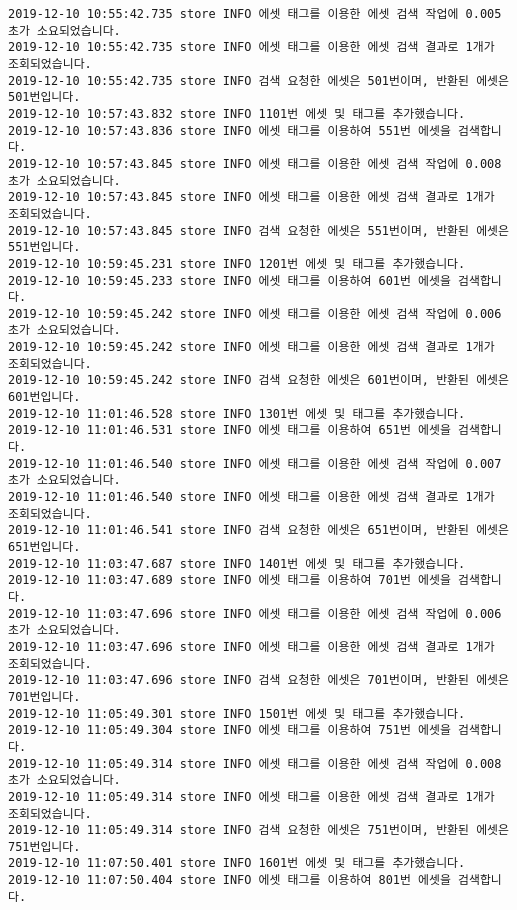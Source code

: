 \begin{Verbatim}[fontsize=\tiny, breaklines=true, breakanywhere=true]
2019-12-10 10:55:42.735 store INFO 에셋 태그를 이용한 에셋 검색 작업에 0.005초가 소요되었습니다.
2019-12-10 10:55:42.735 store INFO 에셋 태그를 이용한 에셋 검색 결과로 1개가 조회되었습니다.
2019-12-10 10:55:42.735 store INFO 검색 요청한 에셋은 501번이며, 반환된 에셋은 501번입니다.
2019-12-10 10:57:43.832 store INFO 1101번 에셋 및 태그를 추가했습니다.
2019-12-10 10:57:43.836 store INFO 에셋 태그를 이용하여 551번 에셋을 검색합니다.
2019-12-10 10:57:43.845 store INFO 에셋 태그를 이용한 에셋 검색 작업에 0.008초가 소요되었습니다.
2019-12-10 10:57:43.845 store INFO 에셋 태그를 이용한 에셋 검색 결과로 1개가 조회되었습니다.
2019-12-10 10:57:43.845 store INFO 검색 요청한 에셋은 551번이며, 반환된 에셋은 551번입니다.
2019-12-10 10:59:45.231 store INFO 1201번 에셋 및 태그를 추가했습니다.
2019-12-10 10:59:45.233 store INFO 에셋 태그를 이용하여 601번 에셋을 검색합니다.
2019-12-10 10:59:45.242 store INFO 에셋 태그를 이용한 에셋 검색 작업에 0.006초가 소요되었습니다.
2019-12-10 10:59:45.242 store INFO 에셋 태그를 이용한 에셋 검색 결과로 1개가 조회되었습니다.
2019-12-10 10:59:45.242 store INFO 검색 요청한 에셋은 601번이며, 반환된 에셋은 601번입니다.
2019-12-10 11:01:46.528 store INFO 1301번 에셋 및 태그를 추가했습니다.
2019-12-10 11:01:46.531 store INFO 에셋 태그를 이용하여 651번 에셋을 검색합니다.
2019-12-10 11:01:46.540 store INFO 에셋 태그를 이용한 에셋 검색 작업에 0.007초가 소요되었습니다.
2019-12-10 11:01:46.540 store INFO 에셋 태그를 이용한 에셋 검색 결과로 1개가 조회되었습니다.
2019-12-10 11:01:46.541 store INFO 검색 요청한 에셋은 651번이며, 반환된 에셋은 651번입니다.
2019-12-10 11:03:47.687 store INFO 1401번 에셋 및 태그를 추가했습니다.
2019-12-10 11:03:47.689 store INFO 에셋 태그를 이용하여 701번 에셋을 검색합니다.
2019-12-10 11:03:47.696 store INFO 에셋 태그를 이용한 에셋 검색 작업에 0.006초가 소요되었습니다.
2019-12-10 11:03:47.696 store INFO 에셋 태그를 이용한 에셋 검색 결과로 1개가 조회되었습니다.
2019-12-10 11:03:47.696 store INFO 검색 요청한 에셋은 701번이며, 반환된 에셋은 701번입니다.
2019-12-10 11:05:49.301 store INFO 1501번 에셋 및 태그를 추가했습니다.
2019-12-10 11:05:49.304 store INFO 에셋 태그를 이용하여 751번 에셋을 검색합니다.
2019-12-10 11:05:49.314 store INFO 에셋 태그를 이용한 에셋 검색 작업에 0.008초가 소요되었습니다.
2019-12-10 11:05:49.314 store INFO 에셋 태그를 이용한 에셋 검색 결과로 1개가 조회되었습니다.
2019-12-10 11:05:49.314 store INFO 검색 요청한 에셋은 751번이며, 반환된 에셋은 751번입니다.
2019-12-10 11:07:50.401 store INFO 1601번 에셋 및 태그를 추가했습니다.
2019-12-10 11:07:50.404 store INFO 에셋 태그를 이용하여 801번 에셋을 검색합니다.

\end{Verbatim}
